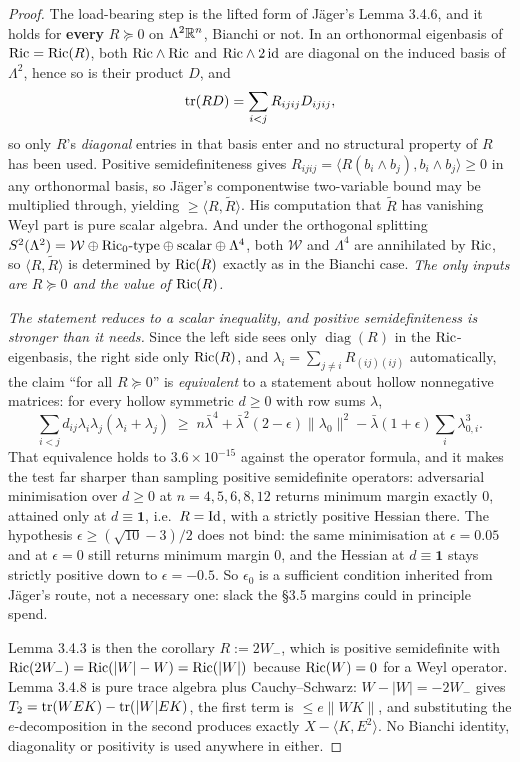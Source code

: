 \begin{proof}
The load-bearing step is the lifted form of J\"ager's Lemma 3.4.6, and it holds for \textbf{every} $R\succeq0$ on $\Lambda^2\mathbb{R}^n$, Bianchi or not. In an orthonormal eigenbasis of $\mathrm{Ric}=\mathrm{Ric}(R)$, both $\mathrm{Ric}\wedge\mathrm{Ric}$ and $\mathrm{Ric}\wedge2\,\mathrm{id}$ are diagonal on the induced basis of $\Lambda^2$, hence so is their product $D$, and
\[
\operatorname{tr}(RD)=\sum_{i<j}R_{ijij}D_{ijij},
\]
so only $R$'s \emph{diagonal} entries in that basis enter and no structural property of $R$ has been used. Positive semidefiniteness gives $R_{ijij}=\langle R(b_i\wedge b_j),b_i\wedge b_j\rangle\ge0$ in any orthonormal basis, so J\"ager's componentwise two-variable bound may be multiplied through, yielding $\ge\langle R,\tilde R\rangle$. His computation that $\tilde R$ has vanishing Weyl part is pure scalar algebra. And under the orthogonal splitting $S^2(\Lambda^2)=\mathcal W\oplus\mathrm{Ric}_0\text{-type}\oplus\text{scalar}\oplus\Lambda^4$, both $\mathcal W$ and $\Lambda^4$ are annihilated by $\mathrm{Ric}$, so $\langle R,\tilde R\rangle$ is determined by $\mathrm{Ric}(R)$ exactly as in the Bianchi case. \emph{The only inputs are $R\succeq0$ and the value of $\mathrm{Ric}(R)$.}

\emph{The statement reduces to a scalar inequality, and positive semidefiniteness is stronger than it needs.} Since the left side sees only $\operatorname{diag}(R)$ in the $\mathrm{Ric}$-eigenbasis, the right side only $\mathrm{Ric}(R)$, and $\lambda_i=\sum_{j\ne i}R_{(ij)(ij)}$ automatically, the claim ``for all $R\succeq0$'' is \emph{equivalent} to a statement about hollow nonnegative matrices: for every hollow symmetric $d\ge0$ with row sums $\lambda$,
\[
\sum_{i<j}d_{ij}\lambda_i\lambda_j(\lambda_i+\lambda_j)\;\ge\;n\bar\lambda^4+\bar\lambda^2(2-\epsilon)\|\lambda_0\|^2-\bar\lambda(1+\epsilon)\sum_i\lambda_{0,i}^3 .
\]
That equivalence holds to $3.6\times10^{-15}$ against the operator formula, and it makes the test far sharper than sampling positive semidefinite operators: adversarial minimisation over $d\ge0$ at $n=4,5,6,8,12$ returns minimum margin exactly $0$, attained only at $d\equiv\mathbf1$, i.e.\ $R=\mathrm{Id}$, with a strictly positive Hessian there. The hypothesis $\epsilon\ge(\sqrt{10}-3)/2$ does not bind: the same minimisation at $\epsilon=0.05$ and at $\epsilon=0$ still returns minimum margin $0$, and the Hessian at $d\equiv\mathbf1$ stays strictly positive down to $\epsilon=-0.5$. So $\epsilon_0$ is a sufficient condition inherited from J\"ager's route, not a necessary one: slack the \S3.5 margins could in principle spend.

Lemma 3.4.3 is then the corollary $R:=2W_-$, which is positive semidefinite with $\mathrm{Ric}(2W_-)=\mathrm{Ric}(|W|-W)=\mathrm{Ric}(|W|)$ because $\mathrm{Ric}(W)=0$ for a Weyl operator. Lemma 3.4.8 is pure trace algebra plus Cauchy--Schwarz: $W-|W|=-2W_-$ gives $T_2=\operatorname{tr}(WEK)-\operatorname{tr}(|W|EK)$, the first term is $\le e\|WK\|$, and substituting the $e$-decomposition in the second produces exactly $X-\langle K,E^2\rangle$. No Bianchi identity, diagonality or positivity is used anywhere in either.
\end{proof}

